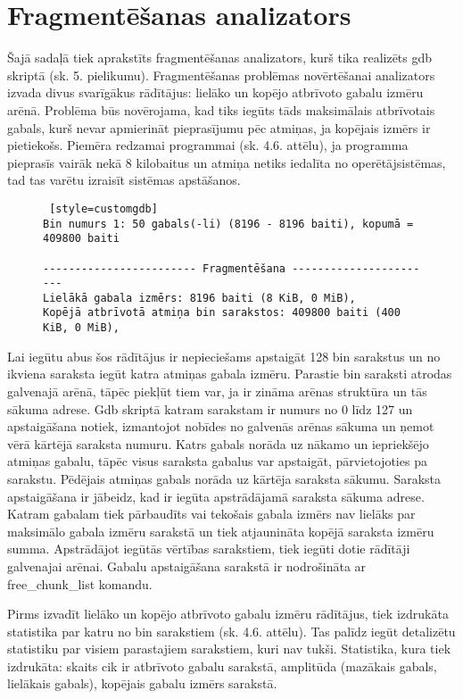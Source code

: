 \section{Fragmentēšanas analizators}
Šajā sadaļā tiek aprakstīts fragmentēšanas analizators, kurš tika realizēts gdb skriptā (sk. 5. pielikumu).
Fragmentēšanas problēmas novērtēšanai analizators izvada divus svarīgākus rādītājus: lielāko un kopējo atbrīvoto gabalu izmēru arēnā.
Problēma būs novērojama, kad tiks iegūts tāds maksimālais atbrīvotais gabals, kurš nevar apmierināt pieprasījumu pēc atmiņas, ja kopējais izmērs ir pietiekošs.
Piemēra redzamai programmai (sk. 4.6. attēlu), ja programma pieprasīs vairāk nekā 8 kilobaitus un atmiņa netiks iedalīta no operētājsistēmas, tad tas varētu izraisīt sistēmas apstāšanos.
\begin{figure}[h]
\begin{lstlisting} [style=customgdb]
Bin numurs 1: 50 gabals(-li) (8196 - 8196 baiti), kopumā = 409800 baiti

------------------------ Fragmentēšana -----------------------
Lielākā gabala izmērs: 8196 baiti (8 KiB, 0 MiB),
Kopējā atbrīvotā atmiņa bin sarakstos: 409800 baiti (400 KiB, 0 MiB),
\end{lstlisting}
\caption{\textbf{\fontsize{11}{12}\selectfont {Fragmentēšanas rādītāji}}}
\end{figure}

Lai iegūtu abus šos rādītājus ir nepieciešams apstaigāt 128 bin sarakstus un no ikviena saraksta iegūt katra atmiņas gabala izmēru.
Parastie bin saraksti atrodas galvenajā arēnā, tāpēc piekļūt tiem var, ja ir zināma arēnas struktūra un tās sākuma adrese.
Gdb skriptā katram sarakstam ir numurs no 0 līdz 127 un apstaigāšana notiek, izmantojot nobīdes no galvenās arēnas sākuma un ņemot vērā kārtējā saraksta numuru.
Katrs gabals norāda uz nākamo un iepriekšējo atmiņas gabalu, tāpēc visus saraksta gabalus var apstaigāt, pārvietojoties pa sarakstu.
Pēdējais atmiņas gabals norāda uz kārtēja saraksta sākumu.
Saraksta apstaigāšana ir jābeidz, kad ir iegūta apstrādājamā saraksta sākuma adrese.
Katram gabalam tiek pārbaudīts vai tekošais gabala izmērs nav lielāks par maksimālo gabala izmēru sarakstā un tiek atjaunināta kopējā saraksta izmēru summa.
Apstrādājot iegūtās vērtības sarakstiem, tiek iegūti dotie rādītāji galvenajai arēnai.
Gabalu apstaigāšana sarakstā ir nodrošināta ar free\_chunk\_list komandu.

Pirms izvadīt lielāko un kopējo atbrīvoto gabalu izmēru rādītājus, tiek izdrukāta statistika par katru no bin sarakstiem (sk. 4.6. attēlu).
Tas palīdz iegūt detalizētu statistiku par visiem parastajiem sarakstiem, kuri nav tukši.
Statistika, kura tiek izdrukāta: skaits cik ir atbrīvoto gabalu sarakstā, amplitūda (mazākais gabals, lielākais gabals), kopējais gabalu izmērs sarakstā.

